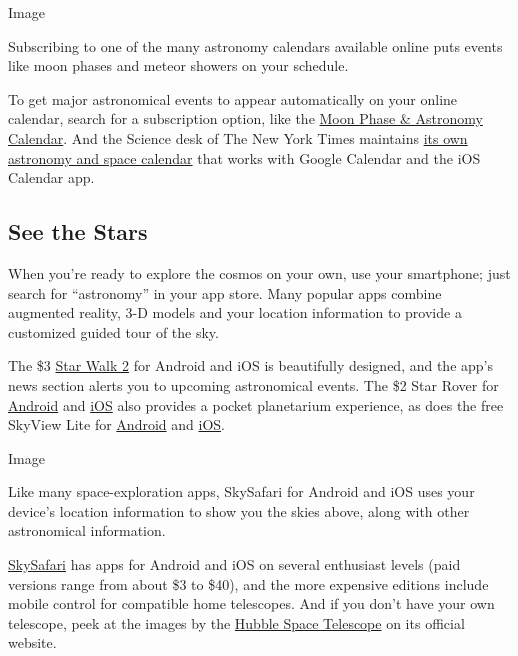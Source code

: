 Image

Subscribing to one of the many astronomy calendars available online puts
events like moon phases and meteor showers on your schedule.

To get major astronomical events to appear automatically on your online
calendar, search for a subscription option, like the
\href{http://cantonbecker.com/astronomy-calendar/}{Moon Phase \&
Astronomy Calendar}. And the Science desk of The New York Times
maintains
\href{https://www.nytimes3xbfgragh.onion/interactive/2020/science/2020-astronomy-space-calendar.html}{its
own astronomy and space calendar} that works with Google Calendar and
the iOS Calendar app.

\hypertarget{see-the-stars}{%
\subsection{See the Stars}\label{see-the-stars}}

When you're ready to explore the cosmos on your own, use your
smartphone; just search for ``astronomy'' in your app store. Many
popular apps combine augmented reality, 3-D models and your location
information to provide a customized guided tour of the sky.

The \$3 \href{https://starwalk.space/en}{Star Walk 2} for Android and
iOS is beautifully designed, and the app's news section alerts you to
upcoming astronomical events. The \$2 Star Rover for
\href{https://play.google.com/store/apps/details?id=net.eefan.star\&hl=en_US}{Android}
and
\href{https://apps.apple.com/us/app/star-rover-hd-night-sky-map/id437217048}{iOS}
also provides a pocket planetarium experience, as does the free SkyView
Lite for
\href{https://play.google.com/store/apps/details?id=com.t11.skyviewfree\&hl=en_US}{Android}
and \href{https://apps.apple.com/mw/app/skyview-lite/id413936865}{iOS}.

Image

Like many space-exploration apps, SkySafari for Android and iOS uses
your device's location information to show you the skies above, along
with other astronomical information.

\href{https://skysafariastronomy.com/}{SkySafari} has apps for Android
and iOS on several enthusiast levels (paid versions range from about \$3
to \$40), and the more expensive editions include mobile control for
compatible home telescopes. And if you don't have your own telescope,
peek at the images by the \href{https://hubblesite.org/}{Hubble Space
Telescope} on its official website.

